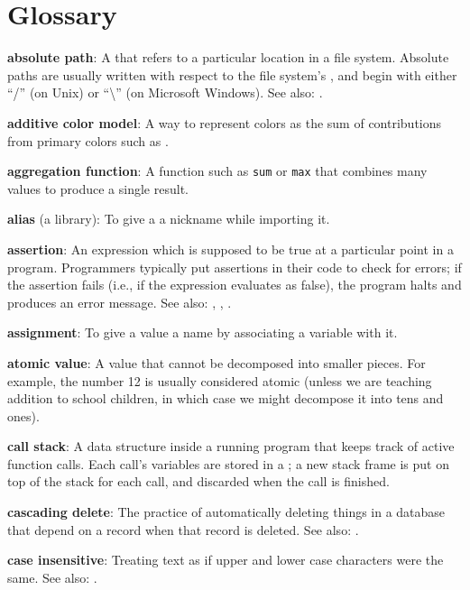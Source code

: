 \documentclass{book}
\begin{document}
\chapter{Glossary}\label{s:gloss}

\textbf{absolute path}: A  that refers to a
particular location in a file system. Absolute paths are usually written
with respect to the file system's , and begin with either ``/'' (on Unix) or
``\textbackslash{}'' (on Microsoft Windows). See also:
.

\textbf{additive color model}: A way to represent colors as the sum of
contributions from primary colors such as .

\textbf{aggregation function}: A function such as \texttt{sum} or
\texttt{max} that combines many values to produce a single result.

\textbf{alias} (a library): To give a  a
nickname while importing it.

\textbf{assertion}: An expression which is supposed to be true at a
particular point in a program. Programmers typically put assertions in
their code to check for errors; if the assertion fails (i.e., if the
expression evaluates as false), the program halts and produces an error
message. See also: ,
,
.

\textbf{assignment}: To give a value a name by associating a variable
with it.

\textbf{atomic value}: A value that cannot be decomposed into smaller
pieces. For example, the number 12 is usually considered atomic (unless
we are teaching addition to school children, in which case we might
decompose it into tens and ones).

\textbf{call stack}: A data structure inside a running program that
keeps track of active function calls. Each call's variables are stored
in a ; a new stack frame is put on
top of the stack for each call, and discarded when the call is finished.

\textbf{cascading delete}: The practice of automatically deleting things
in a database that depend on a record when that record is deleted. See
also: .

\textbf{case insensitive}: Treating text as if upper and lower case
characters were the same. See also: .
\end{document}
